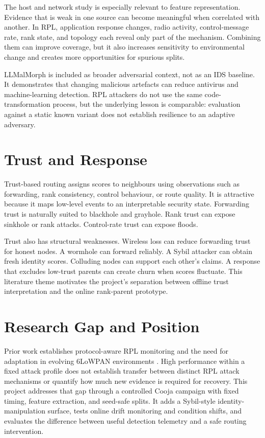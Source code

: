 The host and network study is especially relevant to feature representation. Evidence that is weak in one source can become meaningful when correlated with another. In RPL, application response changes, radio activity, control-message rate, rank state, and topology each reveal only part of the mechanism. Combining them can improve coverage, but it also increases sensitivity to environmental change and creates more opportunities for spurious splits.

LLMalMorph is included as broader adversarial context, not as an IDS baseline. It demonstrates that changing malicious artefacts can reduce antivirus and machine-learning detection. RPL attackers do not use the same code-transformation process, but the underlying lesson is comparable: evaluation against a static known variant does not establish resilience to an adaptive adversary.

\section{Trust and Response}

Trust-based routing assigns scores to neighbours using observations such as forwarding, rank consistency, control behaviour, or route quality. It is attractive because it maps low-level events to an interpretable security state. Forwarding trust is naturally suited to blackhole and grayhole. Rank trust can expose sinkhole or rank attacks. Control-rate trust can expose floods.

Trust also has structural weaknesses. Wireless loss can reduce forwarding trust for honest nodes. A wormhole can forward reliably. A Sybil attacker can obtain fresh identity scores. Colluding nodes can support each other's claims. A response that excludes low-trust parents can create churn when scores fluctuate. This literature theme motivates the project's separation between offline trust interpretation and the online rank-parent prototype.

\section{Research Gap and Position}

Prior work establishes protocol-aware RPL monitoring \cite{svelte2013} and the need for adaptation in evolving 6LoWPAN environments \cite{pasikhani2022arl}. High performance within a fixed attack profile does not establish transfer between distinct RPL attack mechanisms or quantify how much new evidence is required for recovery. This project addresses that gap through a controlled Cooja campaign with fixed timing, feature extraction, and seed-safe splits. It adds a Sybil-style identity-manipulation surface, tests online drift monitoring and condition shifts, and evaluates the difference between useful detection telemetry and a safe routing intervention.


